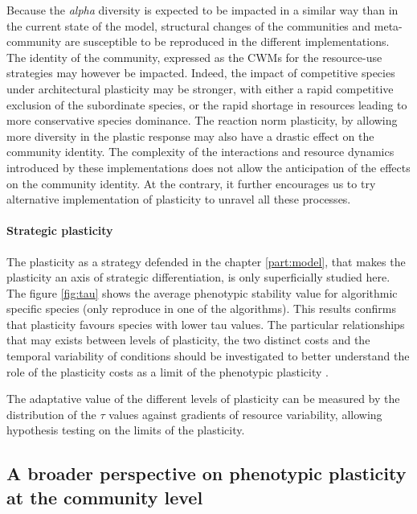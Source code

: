 Because the \textit{alpha} diversity is expected to be impacted in a similar way than in the current state of the model, structural changes of the communities and meta-community are susceptible to be reproduced in the different implementations. The identity of the community, expressed as the CWMs for the resource-use strategies may however be impacted. Indeed, the impact of competitive species under architectural plasticity may be stronger, with either a rapid competitive exclusion of the subordinate species, or the rapid shortage in resources leading to more conservative species dominance. The reaction norm plasticity, by allowing more diversity in the plastic response may also have a drastic effect on the community identity. The complexity of the interactions and resource dynamics introduced by these implementations does not allow the anticipation of the effects on the community identity. At the contrary, it further encourages us to try alternative implementation of plasticity to unravel all these processes.



\paragraph{Strategic plasticity}

The plasticity as a strategy defended in the chapter \ref{part:model}, that makes the plasticity an axis of strategic differentiation, is only superficially studied here. The figure \ref{fig:tau} shows the average phenotypic stability value for algorithmic specific species (only reproduce in one of the algorithms). This results confirms that plasticity favours species with lower tau values. The particular relationships that may exists between levels of plasticity, the two distinct costs and the temporal variability of conditions should be investigated to better understand the role of the plasticity costs as a limit of the phenotypic plasticity \parencite{dewitt_costs_1998, auld_re-evaluating_2009}.

The adaptative value of the different levels of plasticity can be measured by the distribution of the $\tau$ values against gradients of resource variability, allowing hypothesis testing on the limits of the plasticity.

\subsection{A broader perspective on phenotypic plasticity at the community level}

